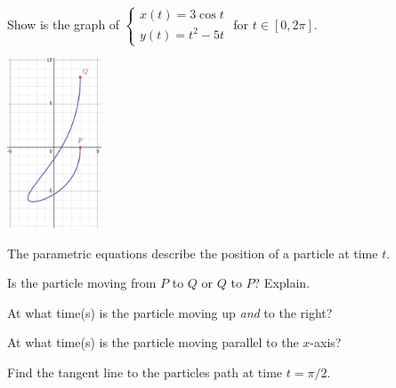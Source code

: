 \documentclass{workbook}
\begin{document}
\begin{slide}
	\question

		Show is the graph of $\displaystyle
		\begin{cases}
			x(t)=3\cos t \\
			y(t)=t^2-5t
		\end{cases}
		$
		for $t\in[0,2\pi]$.
		\begin{center}
	\includegraphics[height=2in]{images/parametric1.png}
		\end{center}

	
	The parametric equations describe the position of a particle at time $t$.

	\begin{parts}
		\item Is the particle moving from $P$ to $Q$ or $Q$ to $P$? Explain.

		\item At what time(s) is the particle moving up \emph{and} to the right?

		\item At what time(s) is the particle moving parallel to the $x$-axis?

		\item Find the tangent line to the particles path at time $t=\pi/2$.
		
	\end{parts}
\end{slide}
\end{document}

